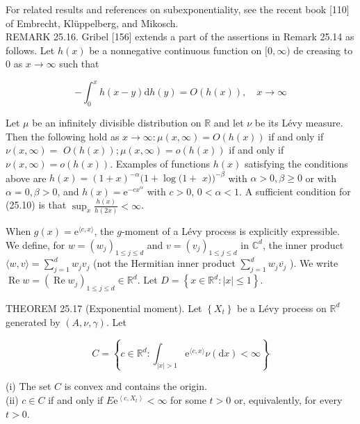 \documentclass[a4paper,11pt]{article}
\begin{document}
For related results and references on subexponentiality, see the recent book [110] of Embrecht, Klüppelberg, and Mikosch.\\

REMARK 25.16. Gribel [156] extends a part of the assertions in Remark 25.14 as follows. Let $h(x)$ be a
nonnegative continuous function on $[0, \infty)$ de creasing to 0 as $x \rightarrow \infty$ such that

\begin{equation*}
    -\int_{0}^{x} h(x-y) \mathrm{d} h(y)=O(h(x)), \quad x \rightarrow \infty \tag{25.10}
\end{equation*}

Let $\mu$ be an infinitely divisible distribution on $\mathbb{R}$ and let $\nu$ be its Lévy measure.
Then the following hold as $x \rightarrow \infty: \mu(x, \infty)=O(h(x))$ if and only
if $\nu(x, \infty)=$ $O(h(x)) ; \mu(x, \infty)=o(h(x))$ if and only if $\nu(x, \infty)=o(h(x))$.
Examples of functions $h(x)$ satisfying the conditions above are $h(x)=(1+x)^{-\alpha}(1+\log (1+$ $x))^{-\beta}$
with $\alpha>0, \beta \geq 0$ or with $\alpha=0, \beta>0$, and $h(x)=\mathrm{e}^{-c x^{\alpha}}$ with $c>0$, $0<\alpha<1$.
A sufficient condition for (25.10) is that $\sup _{x} \frac{h(x)}{h(2 x)}<\infty$.

When $g(x)=\mathrm{e}^{\langle c, x\rangle}$, the $g$-moment of a Lévy process is explicitly expressible.
We define, for $w=\left(w_{j}\right)_{1 \leq j \leq d}$ and $v=\left(v_{j}\right)_{1 \leq j \leq d}$ in $\mathbb{C}^{d}$,
the inner product $\langle w, v\rangle=\sum_{j=1}^{d} w_{j} v_{j}$ (not the Hermitian
inner product $\sum_{j=1}^{d} w_{j} \overline{v_{j}}$ ).
We write $\operatorname{Re} w=\left(\operatorname{Re} w_{j}\right)_{1 \leq j \leq d} \in \mathbb{R}^{d}$. Let $D=\left\{x \in \mathbb{R}^{d}:|x| \leq 1\right\}$. \\


THEOREM 25.17 (Exponential moment). Let $\left\{X_{t}\right\}$ be a Lévy process on $\mathbb{R}^{d}$
generated by $(A, \nu, \gamma)$. Let

$$
    C=\left\{c \in \mathbb{R}^{d}: \int_{|x|>1} \mathrm{e}^{\langle c, x\rangle} \nu(\mathrm{d} x)<\infty\right\}
$$

(i) The set $C$ is convex and contains the origin. \\

(ii) $c \in C$ if and only if $E \mathrm{e}^{\left\langle c, X_{t}\right\rangle}<\infty$ for some $t>0$ or,
equivalently, for every $t>0$.\\
\end{document}
